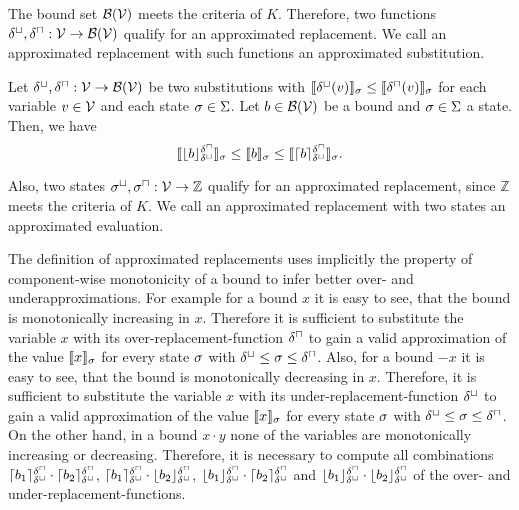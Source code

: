The bound set $\mathcal{B}(\mathcal{V})$ meets the criteria of $K$.
Therefore, two functions $\delta^\sqcup, \delta^\sqcap: \mathcal{V} \rightarrow \mathcal{B}(\mathcal{V})$ qualify for an approximated replacement.
We call an approximated replacement with such functions an approximated substitution.

\begin{theorem}
  Let $\delta^\sqcup, \delta^\sqcap: \mathcal{V} \rightarrow \mathcal{B}(\mathcal{V})$ be two substitutions with $\llbracket \delta^\sqcup(v) \rrbracket_{\sigma} \leq \llbracket \delta^\sqcap(v) \rrbracket_{\sigma}$ for each variable $v \in \mathcal{V}$ and each state $\sigma \in \Sigma$.
  Let $b \in \mathcal{B}(\mathcal{V})$ be a bound and $\sigma \in \Sigma$ a state.
  Then, we have
  \[ \llbracket \lfloor b \rfloor^{\delta^\sqcap}_{\delta^\sqcup} \rrbracket_{\sigma} \leq \llbracket b \rrbracket_{\sigma} \leq \llbracket \lceil b \rceil^{\delta^\sqcap}_{\delta^\sqcup} \rrbracket_{\sigma}. \]
\end{theorem}

Also, two states ${\sigma^\sqcup}, {\sigma^\sqcap}: \mathcal{V} \rightarrow \mathbb{Z}$ qualify for an approximated replacement, since $\mathbb{Z}$ meets the criteria of $K$.
We call an approximated replacement with two states an approximated evaluation.



The definition of approximated replacements uses implicitly the property of component-wise monotonicity of a bound to infer better over- and underapproximations.
For example for a bound $x$ it is easy to see, that the bound is monotonically increasing in $x$.
Therefore it is sufficient to substitute the variable $x$ with its over-replacement-function $\delta^\sqcap$ to gain a valid approximation of the value $\llbracket x \rrbracket_{\sigma}$ for every state $\sigma$ with $\delta^\sqcup \leq \sigma \leq \delta^\sqcap$.
Also, for a bound $-x$ it is easy to see, that the bound is monotonically decreasing in $x$.
Therefore, it is sufficient to substitute the variable $x$ with its under-replacement-function $\delta^\sqcup$ to gain a valid approximation of the value $\llbracket x \rrbracket_{\sigma}$ for every state $\sigma$ with $\delta^\sqcup \leq \sigma \leq \delta^\sqcap$.
On the other hand, in a bound $x \cdot y$ none of the variables are monotonically increasing or decreasing.
Therefore, it is necessary to compute all combinations $\lceil b_1 \rceil^{\delta^\sqcap}_{\delta^\sqcup} \cdot \lceil b_2 \rceil^{\delta^\sqcap}_{\delta^\sqcup}$, $\lceil b_1 \rceil^{\delta^\sqcap}_{\delta^\sqcup} \cdot \lfloor b_2 \rfloor^{\delta^\sqcap}_{\delta^\sqcup}$, $\lfloor b_1 \rfloor^{\delta^\sqcap}_{\delta^\sqcup} \cdot \lceil b_2 \rceil^{\delta^\sqcap}_{\delta^\sqcup}$ and $\lfloor b_1 \rfloor^{\delta^\sqcap}_{\delta^\sqcup} \cdot \lfloor b_2 \rfloor^{\delta^\sqcap}_{\delta^\sqcup}$ of the over- and under-replacement-functions.

